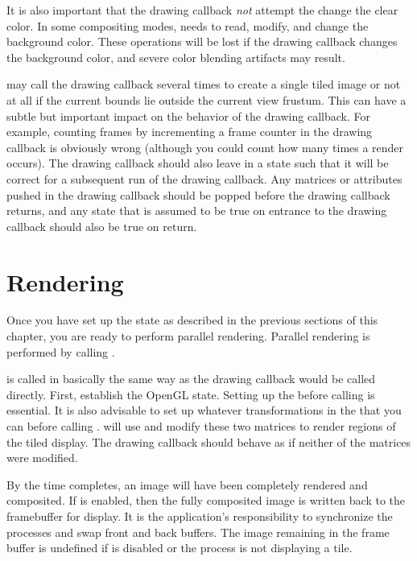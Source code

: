 It is also important that the drawing callback \emph{not} attempt the
change the clear color.  In some compositing modes, \IceT needs to read,
modify, and change the background color.  These operations will be lost if
the drawing callback changes the background color, and severe color
blending artifacts may result.

\IceT may call the drawing callback several times to create a single tiled
image or not at all if the current bounds lie outside the current
view frustum.  This can have a subtle but important impact on the behavior of
the drawing callback.  For example, counting frames by incrementing a frame
counter in the drawing callback is obviously wrong (although you could
count how many times a render occurs).  The drawing callback should also
leave \OpenGL in a state such that it will be correct for a subsequent run
of the drawing callback.  Any matrices or attributes pushed in the drawing
callback should be popped before the drawing callback returns, and any
state that is assumed to be true on entrance to the drawing callback should
also be true on return.



\section{Rendering}
\label{sec:Basic_Usage:Rendering}

Once you have set up the \IceT state as described in the previous sections
of this chapter, you are ready to perform parallel rendering.  Parallel
rendering is performed by calling .

\begin{Table}{3}
\end{Table}

 is called in basically the same way as the
drawing callback would be called directly.  First,
establish the OpenGL state.  Setting up the 
before calling  is essential.  It is also advisable to
set up whatever transformations in the  that
you can before calling .  \IceT will use and modify
these two matrices to render regions of the tiled display.  The drawing
callback should behave as if neither of the matrices were modified.

By the time  completes, an image will have been
completely rendered and composited.  If  is enabled,
then the fully composited image is written back to the \OpenGL framebuffer
for display.  It is the application's responsibility to synchronize the
processes and swap front and back buffers.  The image remaining in the
frame buffer is undefined if  is disabled or the
process is not displaying a tile.

